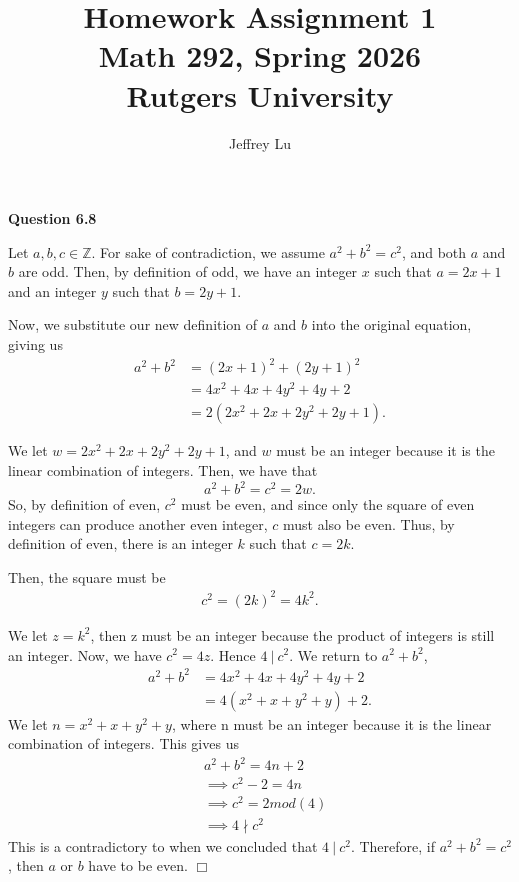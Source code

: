 \documentclass[12pt]{article}
\title{Homework Assignment 1 \\ \large Math 292, Spring 2026 \\ Rutgers University}
\author{Jeffrey Lu}
\begin{document}
\maketitle

\noindent \textbf{Question 6.8}

Let $a,b,c \in{\mathbb{Z}}$. For sake of contradiction, we assume $a^2+b^2 = c^2$, and both $a$ and $b$ are odd.
Then, by definition of odd, we have an integer $x$ such that $a = 2x+1$ and an integer $y$ such that $b = 2y+1$.

Now, we substitute our new definition of $a$ and $b$ into the original equation, giving us
\begin{align*}
    a^2 + b^2 & = (2x+1)^2 + (2y+1)^2           \\
              & = 4x^2 + 4x + 4y^2 + 4y + 2     \\
              & = 2(2x^2 + 2x + 2y^2 + 2y + 1).
\end{align*}

We let $w = 2x^2 + 2x + 2y^2 + 2y + 1$, and $w$ must be an integer because it is the linear combination of integers.
Then, we have that
\[
    a^2 + b^2 = c^2 = 2w.
\]
So, by definition of even, $c^2$ must be even, and since only the square of even integers can produce another even integer, $c$ must also be even.
Thus, by definition of even, there is an integer $k$ such that $c = 2k$.

Then, the square must be
\begin{align*}
    c^2 = (2k)^2 = 4k^2 .
\end{align*}

We let $z = k^2$, then z must be an integer because the product of integers is still an integer.
Now, we have $c^2 = 4z$. Hence $4 ~|~ c^2$. We return to $a^2+b^2$,
\begin{align*}
    a^2 + b^2 & = 4x^2 + 4x + 4y^2 + 4y + 2  \\
              & = 4(x^2 + x + y^2 + y) + 2 .
\end{align*}
We let $n = x^2 + x + y^2 + y$, where n must be an integer because it is the linear combination of integers.
This gives us
\begin{align*}
     & a^2 + b^2 = 4n + 2       \\
     & \implies{c^2-2 = 4n}     \\
     & \implies{} c^2 = 2mod(4) \\
     & \implies{} 4 \nmid{c^2}
\end{align*}
This is a contradictory to when we concluded that $4 ~|~ c^2$. Therefore, if $a^2+b^2 = c^2$, then $a$ or $b$ have to be even. $\Box$
\end{document}
